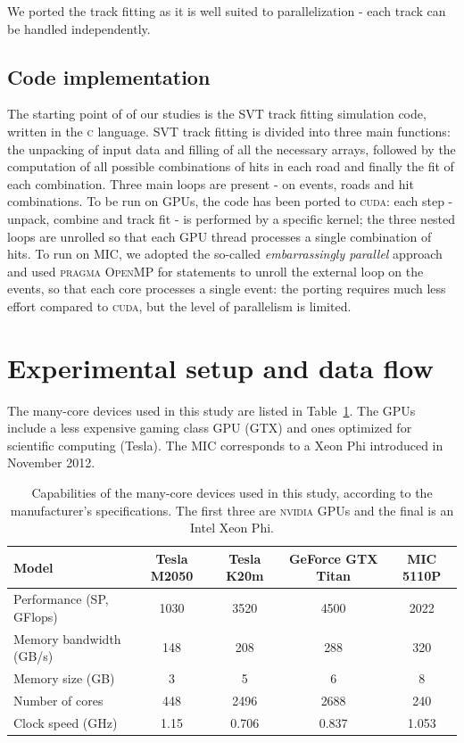 \documentclass[a4]{jpconf}
\begin{document}
We ported the track fitting as it is well suited to parallelization -
each track can be handled independently.

\subsection{Code implementation}
The starting point of of our studies is the SVT track fitting
simulation code, written in the \textsc{c} language. SVT track fitting
is divided into three main functions: the unpacking of input data and
filling of all the necessary arrays, followed by the computation of
all possible combinations of hits in each road and finally the fit of
each combination. Three main loops are present - on events, roads and
hit combinations.  To be run on GPUs, the code has been ported to
\textsc{cuda}: each step - unpack, combine and track fit - is
performed by a specific kernel; the three nested loops are unrolled so
that each GPU thread processes a single combination of hits.  To run
on MIC, we adopted the so-called \textit{embarrassingly parallel}
approach and used \textsc{pragma OpenMP} for statements to unroll the external
loop on the events, so that each core processes a single event: the
porting requires much less effort compared to \textsc{cuda}, but the level of
parallelism is limited.

\section{Experimental setup and data flow}
The many-core devices used in this study are listed in
Table~\ref{tab_hwspecs}. The GPUs include a less expensive gaming
class GPU (GTX) and ones optimized for scientific computing
(Tesla). The MIC corresponds to a Xeon Phi introduced in November 2012.

\begin{table}[!t]
  \centering
  \begin{tabular}{|l|c|c|c|c|}
    \hline
    Model & Tesla M2050 & Tesla K20m & GeForce GTX  Titan & MIC 5110P \\
    \hline
    \hline
    Performance (SP, GFlops) & 1030 & 3520 & 4500 & 2022 \\
    Memory bandwidth  (GB/s) & 148 & 208 & 288  & 320\\   
    Memory size (GB) & 3 & 5 & 6 & 8 \\
    Number of cores & 448 & 2496 & 2688 & 240 \\
    Clock speed (GHz) & 1.15 & 0.706 & 0.837 & 1.053 \\
    \hline
  \end{tabular}
  \caption{Capabilities of the many-core devices used in this study,
    according to the manufacturer's specifications. The first three
    are \textsc{nvidia} GPUs and the final is an Intel Xeon Phi.}
  \label{tab_hwspecs}
\end{table}
\end{document}
